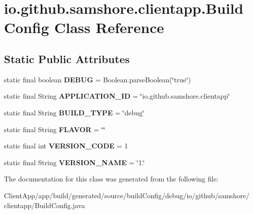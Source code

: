 \hypertarget{classio_1_1github_1_1samshore_1_1clientapp_1_1_build_config}{}\section{io.\+github.\+samshore.\+clientapp.\+Build\+Config Class Reference}
\label{classio_1_1github_1_1samshore_1_1clientapp_1_1_build_config}
\subsection*{Static Public Attributes}
\begin{DoxyCompactItemize}
\item 
static final boolean {\bfseries D\+E\+B\+UG} = Boolean.\+parse\+Boolean(\char`\"{}true\char`\"{})\hypertarget{classio_1_1github_1_1samshore_1_1clientapp_1_1_build_config_a6723df3a1d3832e6db22ef99269c3576}{}\label{classio_1_1github_1_1samshore_1_1clientapp_1_1_build_config_a6723df3a1d3832e6db22ef99269c3576}

\item 
static final String {\bfseries A\+P\+P\+L\+I\+C\+A\+T\+I\+O\+N\+\_\+\+ID} = \char`\"{}io.\+github.\+samshore.\+clientapp\char`\"{}\hypertarget{classio_1_1github_1_1samshore_1_1clientapp_1_1_build_config_a25af248e8420161c04e6e9c70df93e32}{}\label{classio_1_1github_1_1samshore_1_1clientapp_1_1_build_config_a25af248e8420161c04e6e9c70df93e32}

\item 
static final String {\bfseries B\+U\+I\+L\+D\+\_\+\+T\+Y\+PE} = \char`\"{}debug\char`\"{}\hypertarget{classio_1_1github_1_1samshore_1_1clientapp_1_1_build_config_a5b0d3d986a05b1abbe079182900650f8}{}\label{classio_1_1github_1_1samshore_1_1clientapp_1_1_build_config_a5b0d3d986a05b1abbe079182900650f8}

\item 
static final String {\bfseries F\+L\+A\+V\+OR} = \char`\"{}\char`\"{}\hypertarget{classio_1_1github_1_1samshore_1_1clientapp_1_1_build_config_a6512f075334cee2d1d0d868cff6843e4}{}\label{classio_1_1github_1_1samshore_1_1clientapp_1_1_build_config_a6512f075334cee2d1d0d868cff6843e4}

\item 
static final int {\bfseries V\+E\+R\+S\+I\+O\+N\+\_\+\+C\+O\+DE} = 1\hypertarget{classio_1_1github_1_1samshore_1_1clientapp_1_1_build_config_ae128ad13fbd0ef6a97068aba166f5dad}{}\label{classio_1_1github_1_1samshore_1_1clientapp_1_1_build_config_ae128ad13fbd0ef6a97068aba166f5dad}

\item 
static final String {\bfseries V\+E\+R\+S\+I\+O\+N\+\_\+\+N\+A\+ME} = \char`\"{}1.\char`\"{}\hypertarget{classio_1_1github_1_1samshore_1_1clientapp_1_1_build_config_a6d624de812b2bcebfd84791d1c7c3b78}{}\label{classio_1_1github_1_1samshore_1_1clientapp_1_1_build_config_a6d624de812b2bcebfd84791d1c7c3b78}

\end{DoxyCompactItemize}


The documentation for this class was generated from the following file\+:\begin{DoxyCompactItemize}
\item 
Client\+App/app/build/generated/source/build\+Config/debug/io/github/samshore/clientapp/Build\+Config.\+java\end{DoxyCompactItemize}
